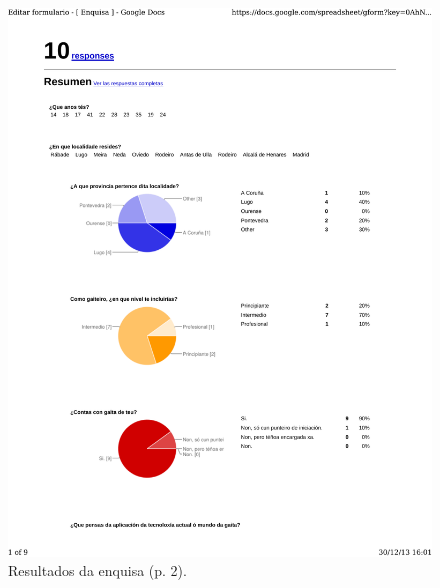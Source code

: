 \begin{figure}
 \centering
 \includegraphics[scale=0.7,page=2,keepaspectratio=true,clip,trim=0cm 0.5cm 0cm 0.5cm]{./imagenes/enquisa.pdf}
 \caption{Resultados da enquisa (p. 2).}
 \label{figura:ResultadosEnquisa2}
\end{figure}

